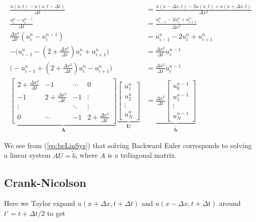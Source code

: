 \documentclass{article}
\begin{document}
\begin{subequations}
	\begin{align}
		\frac{u(x, t) - u(x,t - \Delta t)}{\Delta t}  &= \frac{u(x - \Delta x, t) - 2u(x,t) + u(x+ \Delta x, t)}{\Delta x^2} \\
		\frac{u_i^n - u_i^{n-1}}{\Delta t}  &= \frac{u_{i-1}^n - 2u_i^n + u_{i+1}^n}{\Delta x^2} \\
		\frac{\Delta x^2}{\Delta t}(u_i^n - u_i^{n-1})  &=  u_{i-1}^n - 2u_i^n + u_{i+1}^n\\
		- \Big(u_{i-1}^n - (2 + \frac{\Delta x^2}{\Delta t}) u_i^n + u_{i+1}^n\Big)   &=  \frac{\Delta x^2}{\Delta t}u_i^{n-1}\\
		 \Big(-u_{i-1}^n + (2 + \frac{\Delta x^2}{\Delta t}) u_i^n - u_{i+1}^n\Big)   &=  \frac{\Delta x^2}{\Delta t}u_i^{n-1}\\
		\underbrace{\begin{bmatrix} 2 + \frac{\Delta x^2}{\Delta t} & -1 & \cdots & 0 \\ -1 & 2 + \frac{\Delta x^2}{\Delta t} & -1 & \vdots \\
			\vdots & &  \ddots & \vdots \\ 
			0 & \cdots & -1 & 2 + \frac{\Delta x^2}{\Delta t} \end{bmatrix}}_{\mathbf{A}} 
		\underbrace{\begin{bmatrix} u_1^n\\ u_2^n \\ \vdots\\ u_N^n \end{bmatrix}}_{\mathbf{U}} &= 
		\underbrace{\frac{\Delta x^2}{\Delta t} \begin{bmatrix} u_0^{n-1}\\ u_1^{n-1} \\ \vdots \\ u_N^{n-1}\end{bmatrix}}_{\mathbf{\tilde{b}}}\label{eq:beLinSys}
	\end{align}
\end{subequations}

We see from (\ref{eq:beLinSys}) that solving Backward Euler corresponds to solving a linear system $A U = \tilde{b}$, where $A$ is a trdiagonal matrix. 
	
\subsection{Crank-Nicolson}
Here we Taylor expand $u(x+\Delta x, t+\Delta t)$ and $u(x-\Delta x, t+\Delta t)$ around $t'=t+\Delta t/2$ to get
\end{document}
